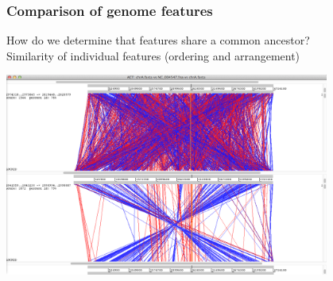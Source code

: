 %
\begin{frame}
  \frametitle{Comparison of genome features}
  How do we determine that features share a common ancestor? \\
  \textcolor{hutton_blue}{Similarity of individual features (ordering and arrangement)} \\
  \begin{center}
    \includegraphics[width=0.8\textwidth]{images/act_rearrangement}
  \end{center}  
\end{frame}

